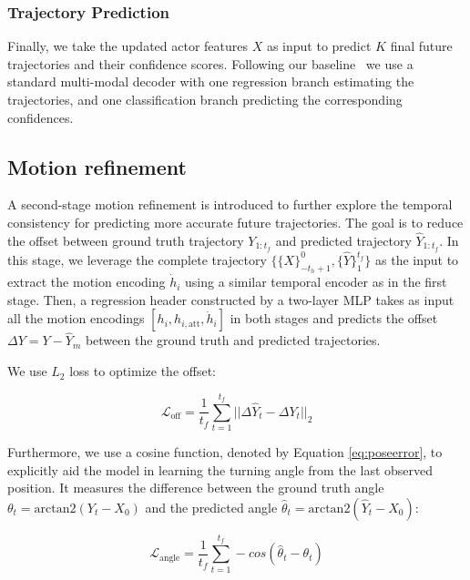 \subsubsection{Trajectory Prediction}

Finally, we take the updated actor features $X$ as input to predict $K$ final future trajectories and their confidence scores. Following our baseline~\cite{wang2022ganet} we use a standard multi-modal decoder  with one regression branch estimating the trajectories, and one classification branch predicting the corresponding confidences.

\subsection{Motion refinement}
\label{subsec:refinement}
A second-stage motion refinement is introduced to further explore the temporal consistency for predicting more accurate future trajectories. The goal is to reduce the offset between ground truth trajectory $Y_{1:t_{f}}$ and predicted trajectory $\hat{Y}_{1:t_{f}}$. In this stage, we leverage the complete trajectory $\{\{X\}_{-t_h+1}^0, \{\hat{Y}\}_{1}^{t_f}\}$ as the input to extract the motion encoding $\dot{h}_i$ using a similar temporal encoder as in the first stage. Then, a regression header constructed by a two-layer MLP takes as input all the motion encodings $[h_i, h_{i, \text{att}}, \dot{h}_i]$ in both stages and predicts the offset $\Delta{Y} = Y - \hat{Y}_{m}$ between the ground truth and predicted trajectories.

We use $L_{2}$ loss to optimize the offset:

\begin{equation}
	\mathcal{L}_\text{off}= \frac{1}{t_{f}}\sum^{t_{f}}_{t=1}||\Delta\hat{Y}_{t} - \Delta{Y}_{t}||_2
	\label{eq:offsetloss}
\end{equation}

Furthermore, we use a cosine function, denoted by Equation \ref{eq:poseerror}, to explicitly aid the model in learning the turning angle from the last observed position. It measures the difference between the ground truth angle $\theta_{t}= \text{arctan2}(Y_{t}-{X}_{0})$ and the predicted angle $\hat{\theta}_{t}= \text{arctan2}(\hat{Y}_{t}-{X}_{0})$:

\begin{equation}
	\mathcal{L}_{\text{angle}}=\frac{1}{t_{f}}\sum^{t_{f}}_{t=1}-cos(\hat{\theta}_{t}-\theta_{t})
	\label{eq:poseerror}
\end{equation}

